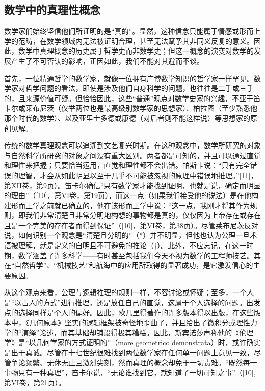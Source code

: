 \subsection*{数学中的真理性概念}

数学家们始终坚信他们所证明的是“真的”。显然，这种信念只能属于情感或形而上学的范畴，在数学领域内无法被证明合理，甚至无法赋予其非同义反复的意义。因此，数学中真理概念的历史属于哲学史而非数学史；但这一概念的演变对数学的发展产生了不可否认的影响，正因如此，我们不能对其避而不谈。

首先，一位精通哲学的数学家，就像一位拥有广博数学知识的哲学家一样罕见。数学家对哲学问题的看法，即使是涉及他们自身科学的问题，也往往是二手或三手的，且来源价值可疑。但恰恰因此，这些“普通”观点对数学史家的兴趣，不亚于笛卡尔或莱布尼茨（仅举两位也是最高级别数学家的思想家）、柏拉图（至少熟悉他那个时代的数学）、以及亚里士多德或康德（对后者则不能这样说）等思想家的原创见解。

传统的数学真理观念可以追溯到文艺复兴时期。在这种观念中，数学所研究的对象与自然科学所研究的对象之间没有重大区别。两者都是可知的，并且可以通过直觉和理性来把握；只要恰当运用，直觉和理性都不会出错。帕斯卡说：“只有完全错误的理智，才会从如此明显以至于几乎不可能被忽视的原理中错误地推理。”{[}11{]}，第XII卷，第9页）。笛卡尔确信“只有数学家才能找到证明，也就是说，确定而明显的理由”（{[}10{]}，第VI卷，第19页），而这一点（如果我们接受他的说法）是在他构建形而上学之前就已确立的，他在该形而上学中说：“这一点，我刚才将其作为规则，即我们非常清楚且非常分明地构想的事物都是真的，仅仅因为上帝存在或存在且是一个完美的存在者而得到保证”（{[}10{]}，第VI卷，第38页）。尽管莱布尼茨反对说，如何识别一个观念是“清楚且分明的”（*）并不明显，但他也认为公理一旦术语被理解，就是定义的自明且不可避免的推论（†）。此外，不应忘记，在这一时期，数学涵盖了许多科学——有时甚至包括我们今天不视为数学的工程师技艺。其在“自然哲学”、“机械技艺”和航海中的应用所取得的显著成功，是它激发信心的主要原因。

从这个观点来看，公理与逻辑推理的规则一样，不容讨论或怀疑；至多，一个人是“以古人的方式”进行推理，还是放任自己的直觉，这属于个人选择的问题。出发点的选择同样是个人的偏好。因此，欧几里得著作的许多版本得以出版，在这些版本中，《几何原本》坚实的逻辑框架被奇怪地歪曲了，并且给出了微积分或理性力学的“演绎”论述，而其基础却铺设得极其糟糕。因此，斯宾诺莎声称他的《伦理学》是“以几何学家的方式证明的”（more geometrico demonstrata）时，或许确实是出于真诚。尽管在十七世纪很难找到两位数学家在任何单一问题上意见一致，尽管争论频繁、无休无止且激烈尖刻，然而真理的概念却免于一切责难。“既然每一事物只有一种真理”，笛卡尔说，“无论谁找到它，就知道了一切可知之事”（{[}10{]}, 第VI卷，第21页）。

